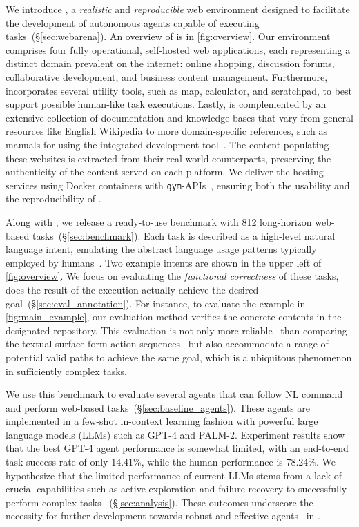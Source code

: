 \documentclass{article}
\begin{document}
We introduce \ours{}, a \emph{realistic} and \emph{reproducible} web environment designed to facilitate the development of autonomous agents capable of executing tasks~(\S\ref{sec:webarena}). An overview of \ours is in \autoref{fig:overview}.
Our environment comprises four fully operational, self-hosted web applications, each representing a distinct domain prevalent on the internet: online shopping, discussion forums, collaborative development, and business content management. %
Furthermore, \ours{} incorporates several utility tools, such as map, calculator, and scratchpad, to best support possible human-like task executions.
Lastly, \ours{} is complemented by an extensive collection of documentation and knowledge bases that vary from general resources like English Wikipedia to more domain-specific references, such as manuals for using the integrated development tool~\citep{fan2022minedojo}. 
The content populating these websites is extracted from their real-world counterparts, preserving the authenticity of the content served on each platform.
We deliver the hosting services using Docker containers with \texttt{gym}-APIs~\citep{1606.01540}, ensuring both the usability and the reproducibility of \ours.

Along with \ours, we release a ready-to-use benchmark with 812 long-horizon web-based tasks~(\S\ref{sec:benchmark}).
Each task is described as a high-level natural language intent, emulating the abstract language usage patterns typically employed by humans~\citep{bisk-etal-2019-benchmarking}. Two example intents are shown in the upper left of \autoref{fig:overview}.
We focus on evaluating the \emph{functional correctness} of these tasks, \ie does the result of the execution actually achieve the desired goal~(\S\ref{sec:eval_annotation}).
For instance, to evaluate the example in \autoref{fig:main_example}, our evaluation method verifies the concrete contents in the designated repository.
This evaluation is not only more reliable~\citep{zhong1709seq2sql,chen2021evaluating,wang2022execution} than comparing the textual surface-form action sequences~\citep{puig_virtualhome:_2018,deng2023mind2web} but also accommodate a range of potential valid paths to achieve the same goal, which is a ubiquitous phenomenon in sufficiently complex tasks.

We use this benchmark to evaluate several agents that can follow NL command and perform web-based tasks~(\S\ref{sec:baseline_agents}). 
These agents are implemented in a few-shot in-context learning fashion with powerful large language models (LLMs) such as \textsc{GPT-4} and \textsc{PALM-2}. 
Experiment results show that the best \textsc{GPT-4} agent performance is somewhat limited, with an end-to-end task success rate of only 14.41\%, while the human performance is 78.24\%.
We hypothesize that the limited performance of current LLMs stems from a lack of crucial capabilities such as active exploration and failure recovery to successfully perform complex tasks ~(\S\ref{sec:analysis}).
These outcomes underscore the necessity for further development towards robust and effective agents~\citep{lecun2022path} in \ours.
\end{document}

